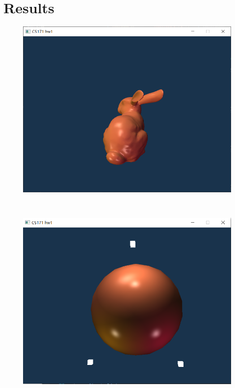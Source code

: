 \documentclass[acmtog]{acmart}
\begin{document}
	\section{Results}
	\begin{figure}[h]
		\begin{minipage}[b]{.4\linewidth}
			\includegraphics[scale=0.25]{bunny1.png}
		\end{minipage}
		\\
		\begin{minipage}[b]{.4\linewidth}
			\includegraphics[scale=0.25]{sphere.png}
		\end{minipage}

\end{figure}
\end{document}
